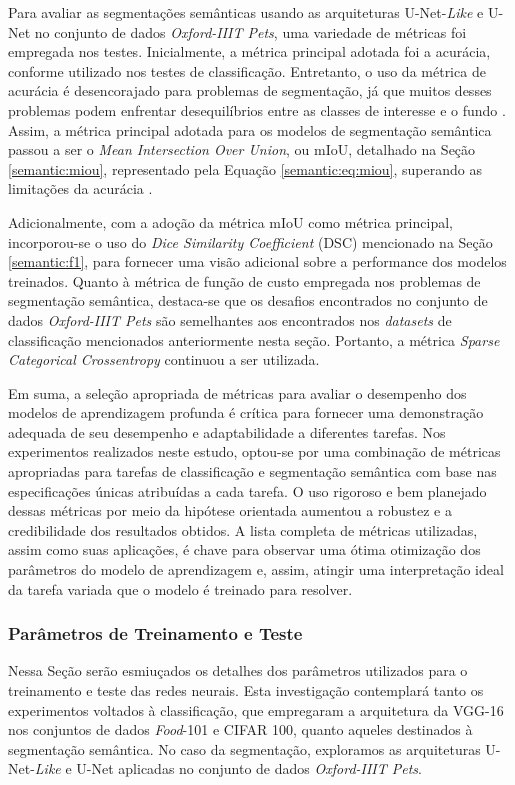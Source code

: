 Para avaliar as segmentações semânticas usando as arquiteturas U-Net-\textit{Like} e U-Net no conjunto de dados \textit{Oxford-IIIT Pets}, uma variedade de métricas foi empregada nos testes. Inicialmente, a métrica principal adotada foi a acurácia, conforme utilizado nos testes de classificação. Entretanto, o uso da métrica de acurácia é desencorajado para problemas de segmentação, já que muitos desses problemas podem enfrentar desequilíbrios entre as classes de interesse e o fundo \citep{Muller2022TowardsSegmentation}. Assim, a métrica principal adotada para os modelos de segmentação semântica passou a ser o \textit{Mean Intersection Over Union}, ou mIoU, detalhado na Seção \ref{semantic:miou}, representado pela Equação \ref{semantic:eq:miou}, superando as limitações da acurácia \citep{Muller2022TowardsSegmentation}.

Adicionalmente, com a adoção da métrica mIoU como métrica principal, incorporou-se o uso do \textit{Dice Similarity Coefficient} (DSC) mencionado na Seção \ref{semantic:f1}, para fornecer uma visão adicional sobre a performance dos modelos treinados. Quanto à métrica de função de custo empregada nos problemas de segmentação semântica, destaca-se que os desafios encontrados no conjunto de dados \textit{Oxford-IIIT Pets} são semelhantes aos encontrados nos \textit{datasets} de classificação mencionados anteriormente nesta seção. Portanto, a métrica \textit{Sparse Categorical Crossentropy} continuou a ser utilizada.

Em suma, a seleção apropriada de métricas para avaliar o desempenho dos modelos de aprendizagem profunda é crítica para fornecer uma demonstração adequada de seu desempenho e adaptabilidade a diferentes tarefas. Nos experimentos realizados neste estudo, optou-se por uma combinação de métricas apropriadas para tarefas de classificação e segmentação semântica com base nas especificações únicas atribuídas a cada tarefa. O uso rigoroso e bem planejado dessas métricas por meio da hipótese orientada aumentou a robustez e a credibilidade dos resultados obtidos. A lista completa de métricas utilizadas, assim como suas aplicações, é chave para observar uma ótima otimização dos parâmetros do modelo de aprendizagem e, assim, atingir uma interpretação ideal da tarefa variada que o modelo é treinado para resolver.


\subsubsection{Parâmetros de Treinamento e Teste}
\label{project:params}
Nessa Seção serão esmiuçados os detalhes dos parâmetros utilizados para o treinamento e teste das redes neurais. Esta investigação contemplará tanto os experimentos voltados à classificação, que empregaram a arquitetura da VGG-16 nos conjuntos de dados \textit{Food}-101 e CIFAR 100, quanto aqueles destinados à segmentação semântica. No caso da segmentação, exploramos as arquiteturas U-Net-\textit{Like} e U-Net aplicadas no conjunto de dados \textit{Oxford-IIIT Pets}.


